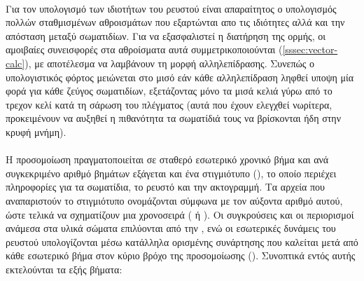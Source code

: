 \paragraph{} Για τον υπολογισμό των ιδιοτήτων του ρευστού είναι απαραίτητος ο υπολογισμός
πολλών σταθμισμένων αθροισμάτων που εξαρτώνται απο τις ιδιότητες αλλά και την απόσταση
μεταξύ σωματιδίων. Για να εξασφαλιστεί η διατήρηση της ορμής, οι αμοιβαίες συνεισφορές στα
αθροίσματα αυτά συμμετρικοποιούνται (\ref{sssec:vector-calc}), με αποτέλεσμα να λαμβάνουν
τη μορφή αλληλεπίδρασης. Συνεπώς ο υπολογιστικός φόρτος μειώνεται στο μισό εάν κάθε
αλληλεπίδραση ληφθεί υποψη μία φορά για κάθε ζεύγος σωματιδίων, εξετάζοντας μόνο τα μισά
κελιά γύρω από το τρεχον κελί κατά τη σάρωση του πλέγματος (αυτά που έχουν ελεγχθεί
νωρίτερα, προκειμένουν να αυξηθεί η πιθανότητα τα σωματίδιά τους να βρίσκονται ήδη στην
κρυφή μνήμη).

\paragraph{} Η προσομοίωση πραγματοποιείται σε σταθερό εσωτερικό χρονικό βήμα και ανά
συγκεκριμένο αριθμό βημάτων εξάγεται και ένα στιγμιότυπο (), το οποίο περιέχει
πληροφορίες για τα σωματίδια, το ρευστό και την ακτογραμμή. Τα αρχεία  που
αναπαριστούν το στιγμιότυπο ονομάζονται σύμφωνα με τον αύξοντα αριθμό αυτού, ώστε τελικά
να σχηματίζουν μια χρονοσειρά ( ή ). Οι συγκρούσεις και οι
περιορισμοί ανάμεσα στα υλικά σώματα επιλύονται από την , ενώ οι εσωτερικές
δυνάμεις του ρευστού υπολογίζονται μέσω κατάλληλα ορισμένης συνάρτησης που καλείται μετά
από κάθε εσωτερικό βήμα στον κύριο βρόχο της προσομοίωσης (). Συνοπτικά
εντός αυτής εκτελούνται τα εξής βήματα:

